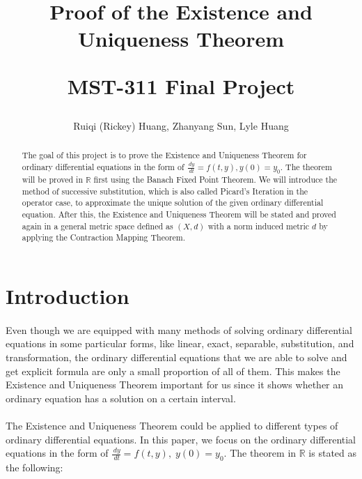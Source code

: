 \documentclass{article}
\title{Proof of the Existence and Uniqueness Theorem\\
\begin{large} 
  MST-311 Final Project
\end{large}}
\author{Ruiqi (Rickey) Huang, Zhanyang Sun, Lyle Huang}
\theoremstyle{definition}
\newtheorem{definition}{Definition}[section]
\theoremstyle{remark}
\theoremstyle{example}
\begin{document}
\maketitle

\begin{abstract}
    The goal of this project is to prove the Existence and Uniqueness Theorem for ordinary differential equations in the form of $\tfrac{\,dy}{\,dt} = f(t,y), y(0) = y_0$. The theorem will be proved in $\mathbb{R}$ first using the Banach Fixed Point Theorem. We will introduce the method of successive substitution, which is also called Picard's Iteration in the operator case, to approximate the unique solution of the given ordinary differential equation. After this, the Existence and Uniqueness Theorem will be stated and proved again in a general metric space defined as $(X,d)$ with a norm induced metric $d$ by applying the Contraction Mapping Theorem.
\end{abstract}

\section{Introduction}

\paragraph{  }

Even though we are equipped with many methods of solving ordinary differential equations in some particular forms, like linear, exact, separable, substitution, and transformation, the ordinary differential equations that we are able to solve and get explicit formula are only a small proportion of all of them. This makes the Existence and Uniqueness Theorem important for us since it shows whether an ordinary equation has a solution on a certain interval. 

\paragraph{  }

The Existence and Uniqueness Theorem could be applied to different types of ordinary differential equations. In this paper, we focus on the ordinary differential equations in the form of $\tfrac{\,dy}{\,dt} = f(t,y),\; y(0) = y_0$. The theorem in $\mathbb{R}$ is stated as the following:

 
\end{document}
